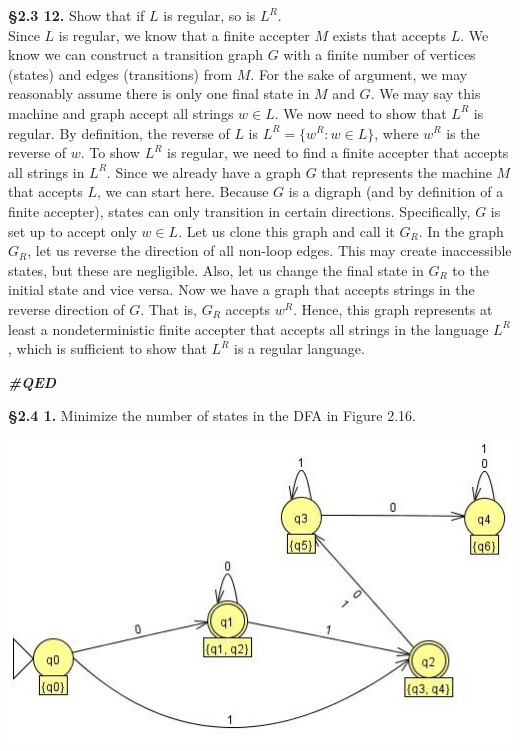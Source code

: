 \documentclass[12pt,letter]{article}
\newcommand{\QED}{
	\begin{flushright}
		\textit{\textbf{\#QED}}
	\end{flushright}
}
\begin{document}
\pagebreak


\textbf{\S 2.3 12.} Show that if $L$ is regular, so is $L^R$. \\

Since $L$ is regular, we know that a finite accepter $M$ exists that accepts $L$. We know we can construct a transition graph $G$ with a finite number of vertices (states) and edges (transitions) from $M$. For the sake of argument, we may reasonably assume there is only one final state in $M$ and $G$. We may say this machine and graph accept all strings $w \in L$. We now need to show that $L^R$ is regular. By definition, the reverse of $L$ is $L^R = \lbrace w^R : w \in L \rbrace$, where $w^R$ is the reverse of $w$. To show $L^R$ is regular, we need to find a finite accepter that accepts all strings in $L^R$. Since we already have a graph $G$ that represents the machine $M$ that accepts $L$, we can start here. Because $G$ is a digraph (and by definition of a finite accepter), states can only transition in certain directions. Specifically, $G$ is set up to accept only $w \in L$. Let us clone this graph and call it $G_R$. In the graph $G_R$, let us reverse the direction of all non-loop edges. This may create inaccessible states, but these are negligible. Also, let us change the final state in $G_R$ to the initial state and vice versa. Now we have a graph that accepts strings in the reverse direction of $G$. That is, $G_R$ accepts $w^R$. Hence, this graph represents at least a nondeterministic finite accepter that accepts all strings in the language $L^R$, which is sufficient to show that $L^R$ is a regular language. \QED


\textbf{\S 2.4 1.} Minimize the number of states in the DFA in Figure 2.16.

\begin{center}
	\includegraphics{"images/Lab 2 - 1"}
\end{center}
\end{document}
